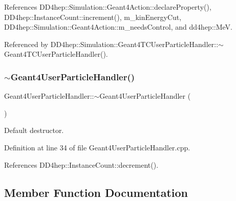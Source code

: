 References D\+D4hep\+::\+Simulation\+::\+Geant4\+Action\+::declare\+Property(), D\+D4hep\+::\+Instance\+Count\+::increment(), m\+\_\+kin\+Energy\+Cut, D\+D4hep\+::\+Simulation\+::\+Geant4\+Action\+::m\+\_\+needs\+Control, and dd4hep\+::\+MeV.



Referenced by D\+D4hep\+::\+Simulation\+::\+Geant4\+T\+C\+User\+Particle\+Handler\+::$\sim$\+Geant4\+T\+C\+User\+Particle\+Handler().

\hypertarget{class_d_d4hep_1_1_simulation_1_1_geant4_user_particle_handler_a0e3bc88e6d3a625600006182d5cdd8c0}{}\label{class_d_d4hep_1_1_simulation_1_1_geant4_user_particle_handler_a0e3bc88e6d3a625600006182d5cdd8c0} 
\subsubsection{\texorpdfstring{$\sim$\+Geant4\+User\+Particle\+Handler()}{~Geant4UserParticleHandler()}}
{\footnotesize\ttfamily Geant4\+User\+Particle\+Handler\+::$\sim$\+Geant4\+User\+Particle\+Handler (\begin{DoxyParamCaption}{ }\end{DoxyParamCaption})\hspace{0.3cm}{\ttfamily [virtual]}}



Default destructor. 



Definition at line 34 of file Geant4\+User\+Particle\+Handler.\+cpp.



References D\+D4hep\+::\+Instance\+Count\+::decrement().



\subsection{Member Function Documentation}
\hypertarget{class_d_d4hep_1_1_simulation_1_1_geant4_user_particle_handler_ad63271464e7ae89e8e7ec0149bc92b93}{}\label{class_d_d4hep_1_1_simulation_1_1_geant4_user_particle_handler_ad63271464e7ae89e8e7ec0149bc92b93} 
